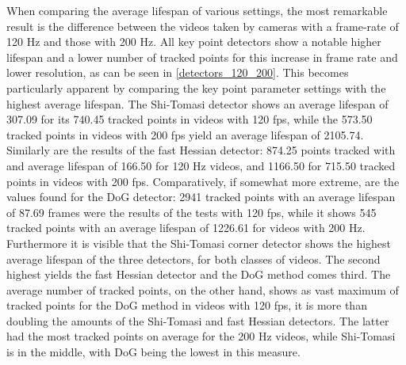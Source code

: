 \documentclass[Bachelorarbeit.tex]{subfiles}
\begin{document}
When comparing the average lifespan of various settings, the most remarkable result is the difference between the videos taken by cameras with a frame-rate of 120 Hz and those with 200 Hz. All key point detectors show a notable higher lifespan and a lower number of tracked points for this increase in frame rate and lower resolution, as can be seen in \autoref{detectors_120_200}. This becomes particularly apparent by comparing the key point parameter settings with the highest average lifespan. The Shi-Tomasi detector shows an average lifespan of 307.09 for its 740.45 tracked points in videos with 120 fps, while the 573.50 tracked points in videos with 200 fps yield an average lifespan of 2105.74. Similarly are the results of the fast Hessian detector: 874.25 points tracked with and average lifespan of 166.50 for 120 Hz videos, and 1166.50 for 715.50 tracked points in videos with 200 fps. Comparatively, if somewhat more extreme, are the values found for the DoG detector: 2941 tracked points with an average lifespan of 87.69 frames were the results of the tests with 120 fps, while it shows 545 tracked points with an average lifespan of 1226.61 for videos with 200 Hz.\\
Furthermore it is visible that the Shi-Tomasi corner detector shows the highest average lifespan of the three detectors, for both classes of videos. The second highest yields the fast Hessian detector and the DoG method comes third. The average number of tracked points, on the other hand, shows as vast maximum of tracked points for the DoG method in videos with 120 fps, it is more than doubling the amounts of the Shi-Tomasi and fast Hessian detectors. The latter had the most tracked points on average for the 200 Hz videos, while 
Shi-Tomasi is in the middle, with DoG being the lowest in this measure.

\end{document}
